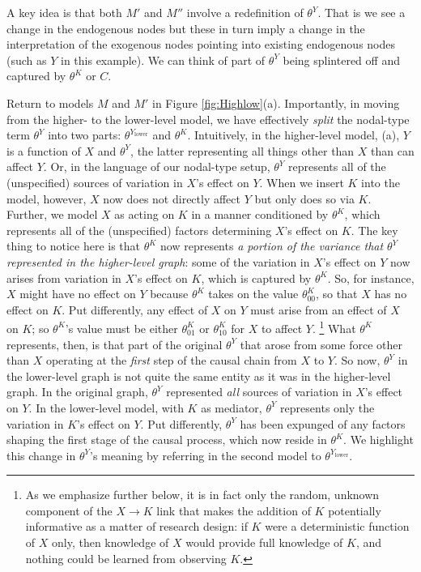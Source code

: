 \documentclass[
  12pt,
]{book}
\begin{document}
A key idea is that both \(M'\) and \(M''\) involve a redefinition of \(\theta^Y\). That is we see a change in the endogenous nodes but these in turn imply a change in the interpretation of the exogenous nodes pointing into existing endogenous nodes (such as \(Y\) in this example). We can think of part of \(\theta^Y\) being splintered off and captured by \(\theta^K\) or \(C\).

Return to models \(M\) and \(M'\) in Figure \ref{fig:Highlow}(a).
Importantly, in moving from the higher- to the lower-level model, we have effectively \emph{split} the nodal-type term \(\theta^Y\) into two parts: \(\theta^{Y_\text{lower}}\) and \(\theta^K\). Intuitively, in the higher-level model, (a), \(Y\) is a function of \(X\) and \(\theta^Y\), the latter representing all things other than \(X\) than can affect \(Y\). Or, in the language of our nodal-type setup, \(\theta^Y\) represents all of the (unspecified) sources of variation in \(X\)'s effect on \(Y\). When we insert \(K\) into the model, however, \(X\) now does not directly affect \(Y\) but only does so via \(K\). Further, we model \(X\) as acting on \(K\) in a manner conditioned by \(\theta^K\), which represents all of the (unspecified) factors determining \(X\)'s effect on \(K\). The key thing to notice here is that \(\theta^K\) now represents \emph{a portion of the variance that \(\theta^Y\) represented in the higher-level graph}: some of the variation in \(X\)'s effect on \(Y\) now arises from variation in \(X\)'s effect on \(K\), which is captured by \(\theta^K\). So, for instance, \(X\) might have no effect on \(Y\) because \(\theta^K\) takes on the value \(\theta^K_{00}\), so that \(X\) has no effect on \(K\). Put differently, any effect of \(X\) on \(Y\) must arise from an effect of \(X\) on \(K\); so \(\theta^K\)'s value must be either \(\theta^K_{01}\) or \(\theta^K_{10}\) for \(X\) to affect \(Y\). \footnote{As we emphasize further below, it is in fact only the random, unknown component of the \(X\rightarrow K\) link that makes the addition of \(K\) potentially informative as a matter of research design: if \(K\) were a deterministic function of \(X\) only, then knowledge of \(X\) would provide full knowledge of \(K\), and nothing could be learned from observing \(K\).} What \(\theta^K\) represents, then, is that part of the original \(\theta^Y\) that arose from some force other than \(X\) operating at the \emph{first} step of the causal chain from \(X\) to \(Y\).
So now, \(\theta^Y\) in the lower-level graph is not quite the same entity as it was in the higher-level graph. In the original graph, \(\theta^Y\) represented \emph{all} sources of variation in \(X\)'s effect on \(Y\). In the lower-level model, with \(K\) as mediator, \(\theta^Y\) represents only the variation in \(K\)'s effect on \(Y\). Put differently, \(\theta^Y\) has been expunged of any factors shaping the first stage of the causal process, which now reside in \(\theta^K\). We highlight this change in \(\theta^Y\)'s meaning by referring in the second model to \(\theta^{Y_\text{lower}}\).
\end{document}
